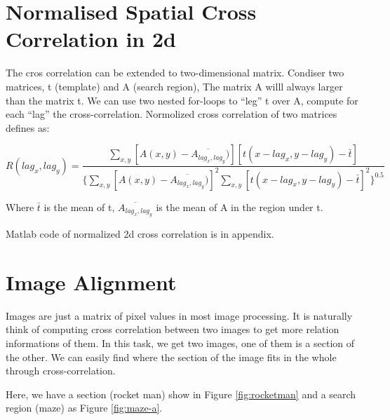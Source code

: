 \section{Normalised Spatial Cross Correlation in 2d}

The cros correlation can be extended to two-dimensional matrix. Condiser two matrices, t (template) and A (search region), The matrix A willl always larger than the matrix t. We can use two nested for-loops to ``leg'' t over A, compute for each ``lag'' the cross-correlation. Normolized cross correlation of two matrices defines as:

\begin{equation*}
R(lag_{x},lag_{y})=
\frac{\sum_{x,y}[A(x,y)-\overline{A_{lag_{x},lag_{y}}})][t(x-lag_{x},y-lag_{y})-\bar{t}]}
{\{\sum_{x,y}[A(x,y)-\overline{A_{lag_{x},lag_{y}}})]^2
	\sum_{x,y}[t(x-lag_{x},y-lag_{y})-\bar{t}]^2
	\}^{0.5}}
\end{equation*}

Where $\bar{t}$ is the mean of t, $\overline{A_{lag_{x},lag_{y}}}$ is the mean of A in the region under t. 

Matlab code of normalized 2d cross correlation is in appendix.

\section{Image Alignment}

Images are just a matrix of pixel values in most image processing. It is naturally think of computing cross correlation between two images to get more relation informations of them. In this task, we get two images, one of them is a section of the other. We can easily find where the section of the image fits in the whole through cross-correlation.

Here, we have a section (rocket man) show in Figure \ref{fig:rocketman} and a search region (maze) as Figure \ref{fig:maze-a}.

